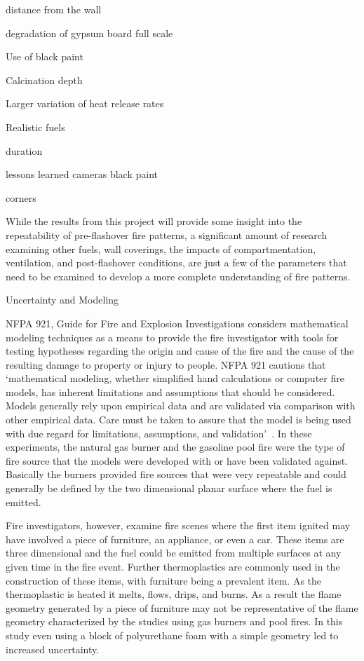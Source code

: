 \documentclass[twoside]{uocthesis}
\begin{document}
{distance from the wall

degradation of gypsum board full scale

Use of black paint

Calcination depth

Larger variation of heat release rates

Realistic fuels

duration

lessons learned  cameras   black paint

corners

While the results from this project will provide some insight into the repeatability of pre-flashover fire patterns, a significant amount of research examining other fuels, wall coverings, the impacts of compartmentation, ventilation, and post-flashover conditions, are just a few of the parameters that need to be examined to develop a more complete understanding of fire patterns.          

Uncertainty and Modeling

NFPA 921, Guide for Fire and Explosion Investigations considers mathematical modeling techniques as a means to provide the fire investigator with tools for testing hypotheses regarding the origin and cause of the fire and the cause of the resulting damage to property or injury to people.  NFPA 921 cautions that `mathematical modeling, whether simplified hand calculations or computer fire models, has inherent limitations and assumptions that should be considered. Models generally rely upon empirical data and are validated via comparison with other empirical data. Care must be taken to assure that the model is being used with due regard for limitations, assumptions, and validation'~\cite{NFPA:921}.  In these experiments, the natural gas burner and the gasoline pool fire were the type of fire source that the models were developed with or have been validated against.  Basically the burners provided fire sources that were very repeatable and could generally be defined by the two dimensional planar surface where the fuel is emitted.  

Fire investigators, however, examine fire scenes where the first item ignited may have involved a piece of furniture, an appliance, or even a car.   These items are three dimensional and the fuel could be emitted from multiple surfaces at any given time in the fire event.  Further thermoplastics are commonly used in the construction of these items, with furniture being a prevalent item.  As the thermoplastic is heated it melts, flows, drips, and burns.   As a result the flame geometry generated by a piece of furniture may not be representative of the flame geometry characterized by the studies using gas burners and pool fires.  In this study even using a block of polyurethane foam with a simple geometry led to increased uncertainty.  








}
\end{document}
